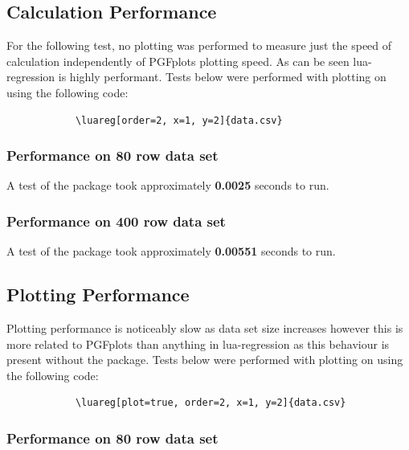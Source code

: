 \documentclass[11pt]{article}
\begin{document}
    
   	\subsection{Calculation Performance}
    
    For the following test, no plotting was performed to measure just the speed of calculation independently of PGFplots plotting speed. 
    As can be seen {\ttfamily lua-regression} is highly performant.
    Tests below were performed with plotting on using the following code:
    
    \begin{codebox}
    	\begin{verbatim}
    		\luareg[order=2, x=1, y=2]{data.csv}
    	\end{verbatim}
    \end{codebox}
    
    
    \subsubsection{Performance on 80 row data set}
    
    A test of the package took approximately \textbf{0.0025} seconds to run.
    
    \subsubsection{Performance on 400 row data set}	
    
    A test of the package took approximately \textbf{0.00551} seconds to run.

	\subsection{Plotting Performance}
	
	Plotting performance is noticeably slow as data set size increases however this is more related to PGFplots than anything in {\ttfamily lua-regression} as this behaviour is present without the package.
	Tests below were performed with plotting on using the following code:
	
	\begin{codebox}
		\begin{verbatim}
			\luareg[plot=true, order=2, x=1, y=2]{data.csv}
		\end{verbatim}
	\end{codebox}

    \subsubsection{Performance on 80 row data set}
\end{document}
